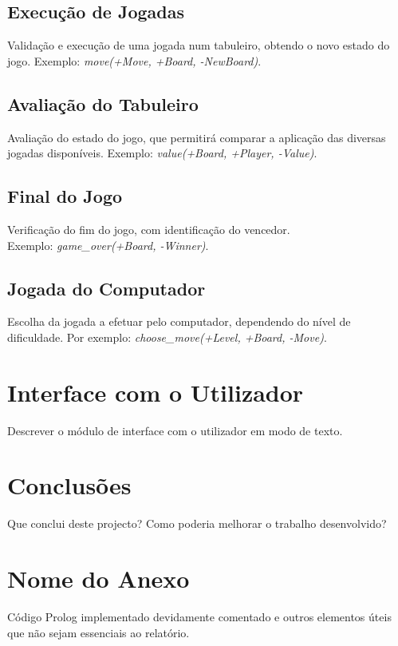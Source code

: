 \documentclass[a4paper]{article}
\begin{document}
\subsection{Execução de Jogadas} Validação e execução de uma jogada num tabuleiro, obtendo o novo estado do jogo. Exemplo: \textit{move(+Move, +Board, -NewBoard)}.

\subsection{Avaliação do Tabuleiro} Avaliação do estado do jogo, que permitirá comparar a aplicação das diversas jogadas disponíveis. Exemplo: \textit{value(+Board, +Player, -Value)}.

\subsection{Final do Jogo} Verificação do fim do jogo, com identificação do vencedor. \\Exemplo: \textit{game\_over(+Board, -Winner)}.

\subsection{Jogada do Computador} Escolha da jogada a efetuar pelo computador, dependendo do nível de dificuldade. Por exemplo: \textit{choose\_move(+Level, +Board, -Move)}.


\section{Interface com o Utilizador}

Descrever o módulo de interface com o utilizador em modo de texto.


\section{Conclusões}
Que conclui deste projecto? Como poderia melhorar o trabalho desenvolvido?


\clearpage
%
%

\newpage
\appendix
\section{Nome do Anexo}
Código Prolog implementado devidamente comentado e outros elementos úteis que não sejam essenciais ao relatório.
\end{document}
